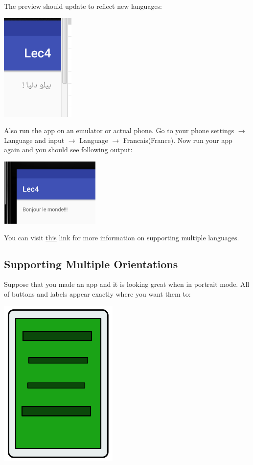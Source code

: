 The preview should update to reflect new languages:

\begin{center}
	\includegraphics[scale=0.4]{chapters/ch04/images/20}
\end{center}

Also run the app on an emulator or actual phone. Go to your phone settings $\rightarrow$ Language and input $\rightarrow$ Language $\rightarrow$ Francais(France). Now run your app again and you should see following output:

\begin{center}
	\includegraphics[scale=0.4]{chapters/ch04/images/21}
\end{center}

\vskip 3mm
You can visit \href{https://developer.android.com/training/basics/supporting-devices/languages.html}{this} link for more information on supporting multiple languages.

\subsection{Supporting Multiple Orientations}

Suppose that you made an app and it is looking great when in portrait mode. All of buttons and labels appear exactly where you want them to:

\begin{center}
	\includegraphics[scale=0.4]{chapters/ch04/images/22}
\end{center}

